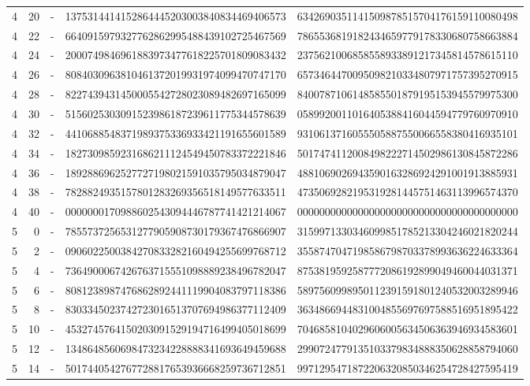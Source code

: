 \begin{longtable}{rrrll}
4 & 20 & - & 1375314414152864445203003840834469406573 & 6342690351141509878515704176159110080498 \\
4 & 22 & - & 6640915979327762862995488439102725467569 & 7865536819182434659779178330680758663884 \\
4 & 24 & - & 2000749846961883973477618225701809083432 & 2375621006858558933891217345814578615110 \\
4 & 26 & - & 8084030963810461372019931974099470747170 & 6573464470095098210334807971757395270915 \\
4 & 28 & - & 8227439431450005542728023089482697165099 & 8400787106148585501879195153945579975300 \\
4 & 30 & - & 5156025303091523986187239611775344578639 & 0589920011016405388416044594779760970910 \\
4 & 32 & - & 4410688548371989375336933421191655601589 & 9310613716055505887550066558380416935101 \\
4 & 34 & - & 1827309859231686211124549450783372221846 & 5017474112008498222714502986130845872286 \\
4 & 36 & - & 1892886962527727198021591035795034879047 & 4881069026943590163286924291001913885931 \\
4 & 38 & - & 7828824935157801283269356518149577633511 & 4735069282195319281445751463113996574370 \\
4 & 40 & - & 0000000170988602543094446787741421214067 & 0000000000000000000000000000000000000000 \\
5 & 0 & - & 7855737256531277905908730179367476866907 & 3159971330346099851785213304246021820244 \\
5 & 2 & - & 0906022500384270833282160494255699768712 & 3558747047198586798703378993636224633364 \\
5 & 4 & - & 7364900067426763715551098889238496782047 & 8753819592587772086192899049460044031371 \\
5 & 6 & - & 8081238987476862892441119904083797118386 & 5897560998950112391591801240532003289946 \\
5 & 8 & - & 8303345023742723016513707694986377112409 & 3634866944831004855697697588516951895422 \\
5 & 10 & - & 4532745764150203091529194716499405018699 & 7046858104029606005634506363946934583601 \\
5 & 12 & - & 1348648560698473234228888341693649459688 & 2990724779135103379834888350628858794060 \\
5 & 14 & - & 5017440542767728817653936668259736712851 & 9971295471872206320850346254728427595419 \\

\end{longtable}
